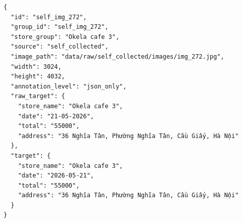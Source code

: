 \begin{lstlisting}[style=json, caption={Một mẫu thực tế trong processed test JSONL}, label={lst:jsonl-sample}]
{
  "id": "self_img_272",
  "group_id": "self_img_272",
  "store_group": "Okela cafe 3",
  "source": "self_collected",
  "image_path": "data/raw/self_collected/images/img_272.jpg",
  "width": 3024,
  "height": 4032,
  "annotation_level": "json_only",
  "raw_target": {
    "store_name": "Okela cafe 3",
    "date": "21-05-2026",
    "total": "55000",
    "address": "36 Nghĩa Tân, Phường Nghĩa Tân, Cầu Giấy, Hà Nội"
  },
  "target": {
    "store_name": "Okela cafe 3",
    "date": "2026-05-21",
    "total": "55000",
    "address": "36 Nghĩa Tân, Phường Nghĩa Tân, Cầu Giấy, Hà Nội"
  }
}
\end{lstlisting}
